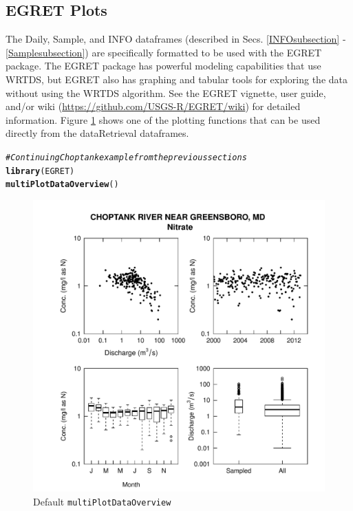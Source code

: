 \documentclass[a4paper,11pt]{article}\usepackage[]{graphicx}\usepackage[]{color}
\makeatletter
\def\maxwidth{ %
  \ifdim\Gin@nat@width>\linewidth
    \linewidth
  \else
    \Gin@nat@width
  \fi
}
\newcommand{\hlcom}[1]{\textcolor[rgb]{0.678,0.584,0.686}{\textit{#1}}}%
\newcommand{\hlstd}[1]{\textcolor[rgb]{0.345,0.345,0.345}{#1}}%
\newcommand{\hlkwd}[1]{\textcolor[rgb]{0.737,0.353,0.396}{\textbf{#1}}}%
\newenvironment{kframe}{%
 \def\at@end@of@kframe{}%
 \ifinner\ifhmode%
  \def\at@end@of@kframe{\end{minipage}}%
  \begin{minipage}{\columnwidth}%
 \fi\fi%
 \def\FrameCommand##1{\hskip\@totalleftmargin \hskip-\fboxsep
 \colorbox{shadecolor}{##1}\hskip-\fboxsep
     \hskip-\linewidth \hskip-\@totalleftmargin \hskip\columnwidth}%
 \MakeFramed {\advance\hsize-\width
   \@totalleftmargin\z@ \linewidth\hsize
   \@setminipage}}%
 {\par\unskip\endMakeFramed%
 \at@end@of@kframe}
\newenvironment{knitrout}{}{} %
\makeatother
\begin{document}
\FloatBarrier

\subsection{EGRET Plots}
The Daily, Sample, and INFO dataframes (described in Secs. \ref{INFOsubsection} - \ref{Samplesubsection}) are specifically formatted to be used with the EGRET package. The EGRET package has powerful modeling capabilities that use WRTDS, but EGRET also has graphing and tabular tools for exploring the data without using the WRTDS algorithm. See the EGRET vignette, user guide, and/or wiki (\url{https://github.com/USGS-R/EGRET/wiki}) for detailed information. Figure \ref{fig:egretEx} shows one of the plotting functions that can be used directly from the dataRetrieval dataframes.

\begin{knitrout}
\color{fgcolor}\begin{kframe}
\begin{alltt}
\hlcom{# Continuing Choptank example from the previous sections}
\hlkwd{library}\hlstd{(EGRET)}
\hlkwd{multiPlotDataOverview}\hlstd{()}
\end{alltt}
\end{kframe}\begin{figure}[]

\includegraphics[width=\maxwidth]{figure/egretEx} \caption[Default \texttt{multiPlotDataOverview}]{Default \texttt{multiPlotDataOverview}\label{fig:egretEx}}
\end{figure}


\end{knitrout}
\end{document}
